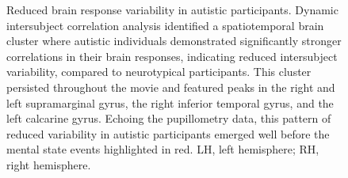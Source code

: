 \begin{figure}[!ht]
	\centering
	\caption{Reduced brain response variability in autistic participants. Dynamic intersubject correlation analysis identified a spatiotemporal brain cluster where autistic individuals demonstrated significantly stronger correlations in their brain responses, indicating reduced intersubject variability, compared to neurotypical participants. This cluster persisted throughout the movie and featured peaks in the right and left supramarginal gyrus, the right inferior temporal gyrus, and the left calcarine gyrus. Echoing the pupillometry data, this pattern of reduced variability in autistic participants emerged well before the mental state events highlighted in red. LH, left hemisphere; RH, right hemisphere.}
    \vspace*{-10pt}
	\label{fig:isc-fmri-time}
\end{figure}



